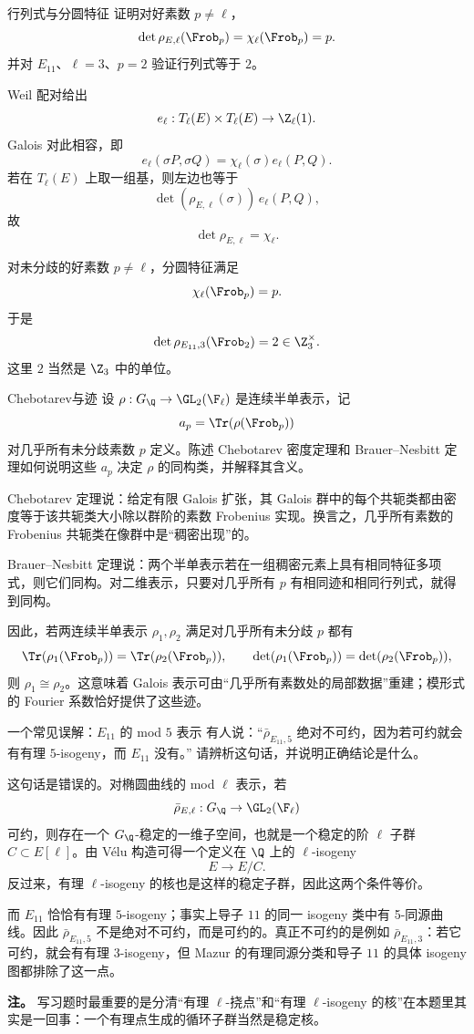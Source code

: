 \begin{problem}{行列式与分圆特征}
证明对好素数 $p\neq \ell$，
\[
\det\rho_{E,\ell}(\Frob_p)=\chi_\ell(\Frob_p)=p.
\]
并对 $E_{11}$、$\ell=3$、$p=2$ 验证行列式等于 $2$。
\end{problem}
\begin{solution}
Weil 配对给出
\[
e_\ell:T_\ell(E)\times T_\ell(E)\to \Z_\ell(1).
\]
Galois 对此相容，即
\[
e_\ell(\sigma P,\sigma Q)=\chi_\ell(\sigma)e_\ell(P,Q).
\]
若在 $T_\ell(E)$ 上取一组基，则左边也等于
\[
\det(\rho_{E,\ell}(\sigma))\,e_\ell(P,Q),
\]
故
\[
\det\rho_{E,\ell}=\chi_\ell.
\]

对未分歧的好素数 $p\neq \ell$，分圆特征满足
\[
\chi_\ell(\Frob_p)=p.
\]
于是
\[
\det\rho_{E_{11},3}(\Frob_2)=2\in \Z_3^\times.
\]
这里 $2$ 当然是 $\Z_3$ 中的单位。
\end{solution}

\begin{problem}{Chebotarev与迹}
设 $\rho:G_\Q\to \GL_2(\F_\ell)$ 是连续半单表示，记
\[
a_p=\Tr(\rho(\Frob_p))
\]
对几乎所有未分歧素数 $p$ 定义。陈述 Chebotarev 密度定理和 Brauer--Nesbitt 定理如何说明这些 $a_p$ 决定 $\rho$ 的同构类，并解释其含义。
\end{problem}
\begin{solution}
Chebotarev 定理说：给定有限 Galois 扩张，其 Galois 群中的每个共轭类都由密度等于该共轭类大小除以群阶的素数 Frobenius 实现。换言之，几乎所有素数的 Frobenius 共轭类在像群中是“稠密出现”的。

Brauer--Nesbitt 定理说：两个半单表示若在一组稠密元素上具有相同特征多项式，则它们同构。对二维表示，只要对几乎所有 $p$ 有相同迹和相同行列式，就得到同构。

因此，若两连续半单表示 $\rho_1,\rho_2$ 满足对几乎所有未分歧 $p$ 都有
\[
\Tr(\rho_1(\Frob_p))=\Tr(\rho_2(\Frob_p)),
\qquad
\det(\rho_1(\Frob_p))=\det(\rho_2(\Frob_p)),
\]
则 $\rho_1\cong \rho_2$。这意味着 Galois 表示可由“几乎所有素数处的局部数据”重建；模形式的 Fourier 系数恰好提供了这些迹。
\end{solution}

\begin{problem}{一个常见误解：$E_{11}$ 的 mod $5$ 表示}
有人说：``$\bar\rho_{E_{11},5}$ 绝对不可约，因为若可约就会有有理 $5$-isogeny，而 $E_{11}$ 没有。'' 请辨析这句话，并说明正确结论是什么。
\end{problem}
\begin{solution}
这句话是错误的。对椭圆曲线的 mod $\ell$ 表示，若
\[
\bar\rho_{E,\ell}:G_\Q\to \GL_2(\F_\ell)
\]
可约，则存在一个 $G_\Q$-稳定的一维子空间，也就是一个稳定的阶 $\ell$ 子群 $C\subset E[\ell]$。由 Vélu 构造可得一个定义在 $\Q$ 上的 $\ell$-isogeny
\[
E\to E/C.
\]
反过来，有理 $\ell$-isogeny 的核也是这样的稳定子群，因此这两个条件等价。

而 $E_{11}$ 恰恰有有理 $5$-isogeny；事实上导子 $11$ 的同一 isogeny 类中有 5-同源曲线。因此 $\bar\rho_{E_{11},5}$ 不是绝对不可约，而是可约的。真正不可约的是例如 $\bar\rho_{E_{11},3}$：若它可约，就会有有理 $3$-isogeny，但 Mazur 的有理同源分类和导子 $11$ 的具体 isogeny 图都排除了这一点。

\textbf{注。} 写习题时最重要的是分清“有理 $\ell$-挠点”和“有理 $\ell$-isogeny 的核”在本题里其实是一回事：一个有理点生成的循环子群当然是稳定核。
\end{solution}

